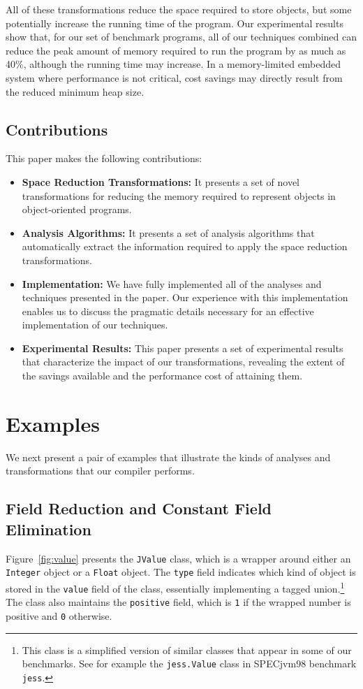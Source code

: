 \documentclass{sig-alt-full}
\begin{document}
All of these transformations reduce the space required to store
objects, but some potentially increase the running time of the program.
Our experimental results show that, for our set of benchmark
programs, all of our techniques combined can reduce the peak amount of memory
required to run the program by as much as 40\%, although the running
time may increase.  In a memory-limited embedded system where
performance is not critical, cost savings may directly result from the
reduced minimum heap size.

\subsection{Contributions}

This paper makes the following contributions:
\begin{itemize}
\item {\bf Space Reduction Transformations:} It presents a set
of novel transformations for reducing the memory required to 
represent objects in object-oriented programs.

\item {\bf Analysis Algorithms:} It presents a set of 
analysis algorithms that automatically extract the 
information required to apply the space reduction 
transformations.

\item {\bf Implementation:} We have fully 
implemented all of the analyses and techniques 
presented in the paper. Our experience with this
implementation enables us to discuss the pragmatic
details necessary for an effective implementation 
of our techniques. 

\item {\bf Experimental Results:} This paper presents a set
of experimental results that characterize the impact
of our transformations, revealing the extent of the
savings available and the performance cost of attaining them.
\end{itemize}
%
\section{Examples}
%
We next present a pair of examples that illustrate the kinds of 
analyses and transformations that our compiler performs.
%
\subsection{Field Reduction and Constant Field \\ Elimination}
%
Figure~\ref{fig:value} presents the {\tt JValue} class, which is 
a wrapper around either an {\tt Integer} object or a {\tt Float}
object. The {\tt type} field indicates which kind of object
is stored in the {\tt value} field of the class, 
essentially implementing a tagged 
union.\footnote{This class is a simplified version of similar
classes that appear in some of our benchmarks.
See for example the {\tt jess.Value} class in SPECjvm98 benchmark
{\tt jess}.} 
The class also maintains the {\tt positive} field, which is
{\tt 1} if the wrapped number is positive and {\tt 0} otherwise. 
\end{document}
